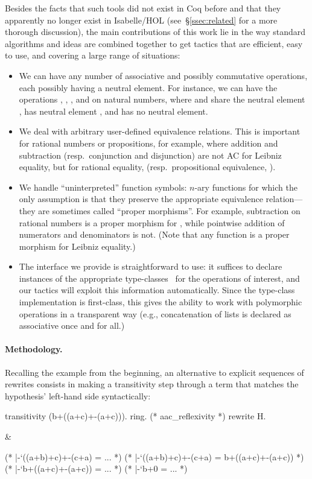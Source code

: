 \documentclass{llncs}
\begin{document}
Besides the facts that such tools did not exist in Coq before and that
they apparently no longer exist in Isabelle/HOL
(see~\S\ref{ssec:related} for a more thorough discussion), the main
contributions of this work lie in the way standard algorithms and
ideas are combined together to get tactics that are efficient, easy to
use, and covering a large range of situations:
\begin{itemize}
\item We can have any number of associative and possibly commutative
  operations, each possibly having a neutral element. For instance, we
  can have the operations , , \code{+}, and
  \code{*} on natural numbers, where  and \code{+} share the
  neutral element , \code{*} has neutral element , and
   has no neutral element.
\item We deal with arbitrary user-defined equivalence relations. This
  is important for rational numbers or propositions, for example,
  where addition and subtraction (resp.\ conjunction and disjunction)
  are not AC for Leibniz equality, but for rational equality,
   (resp.\ propositional equivalence, ).
\item We handle ``uninterpreted'' function symbols: $n$-ary functions
  for which the only assumption is that they preserve the appropriate
  equivalence relation---they are sometimes called ``proper
  morphisms''.  For example, subtraction on rational numbers is a
  proper morphism for , while pointwise addition of
  numerators and denominators is not. (Note that any function is a
  proper morphism for Leibniz equality.)
\item The interface we provide is straightforward to use: it suffices
  to declare instances of the appropriate
  type-classes~\cite{SozeauOury08} for the operations of interest, and
  our tactics will exploit this information automatically.  Since the
  type-class implementation is first-class, this gives the ability to
  work with polymorphic operations in a transparent way (e.g.,
  concatenation of lists is declared as associative once and for all.)
\end{itemize}


\paragraph{Methodology.} 

Recalling the example from the beginning, an alternative to explicit
sequences of rewrites consists in making a transitivity step through a
term that matches the hypothesis' left-hand side syntactically:
\begin{twolistings}
\begin{coq}
transitivity (b+((a+c)+-(a+c))).
  ring. (* aac_reflexivity *)
rewrite H.
\end{coq}
&
\begin{coq}
(* |-`((a+b)+c)+-(c+a) = ... *)
(* \tab|-`((a+b)+c)+-(c+a) = b+((a+c)+-(a+c)) *)
(* |-`b+((a+c)+-(a+c)) = ... *)
(* |-`b+0 = ... *)
\end{coq}
\end{twolistings}
\end{document}
